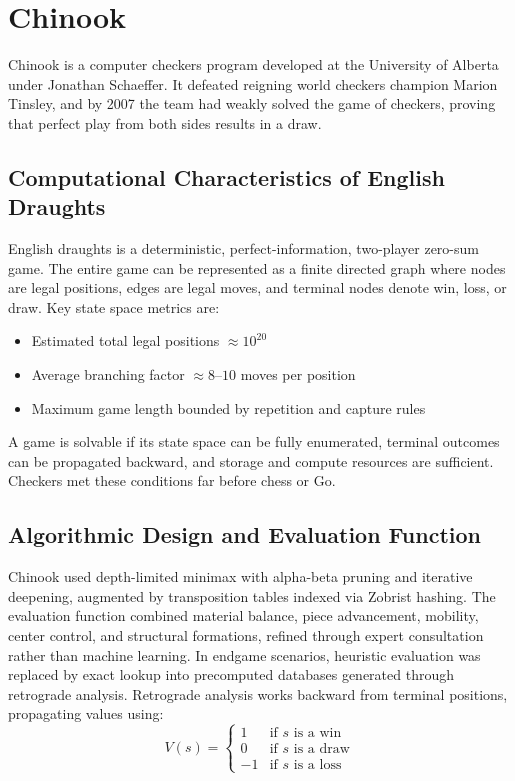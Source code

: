 \documentclass[12pt,a4paper]{report}
\begin{document}
\section{Chinook}
Chinook is a computer checkers program developed at the University of Alberta under Jonathan Schaeffer. It defeated reigning world checkers champion Marion Tinsley, and by 2007 the team had weakly solved the game of checkers, proving that perfect play from both sides results in a draw.

\subsection{Computational Characteristics of English Draughts}
English draughts is a deterministic, perfect-information, two-player zero-sum game. The entire game can be represented as a finite directed graph where nodes are legal positions, edges are legal moves, and terminal nodes denote win, loss, or draw. Key state space metrics are:
\begin{itemize}
    \item Estimated total legal positions $\approx 10^{20}$
    \item Average branching factor $\approx 8$--$10$ moves per position
    \item Maximum game length bounded by repetition and capture rules
\end{itemize}
A game is solvable if its state space can be fully enumerated, terminal outcomes can be propagated backward, and storage and compute resources are sufficient. Checkers met these conditions far before chess or Go.

\subsection{Algorithmic Design and Evaluation Function}
Chinook used depth-limited minimax with alpha-beta pruning and iterative deepening, augmented by transposition tables indexed via Zobrist hashing. The evaluation function combined material balance, piece advancement, mobility, center control, and structural formations, refined through expert consultation rather than machine learning. In endgame scenarios, heuristic evaluation was replaced by exact lookup into precomputed databases generated through retrograde analysis. Retrograde analysis works backward from terminal positions, propagating values using:
\[
V(s) = \begin{cases} 1 & \text{if } s \text{ is a win} \\ 0 & \text{if } s \text{ is a draw} \\ -1 & \text{if } s \text{ is a loss} \end{cases}
\]
\end{document}
